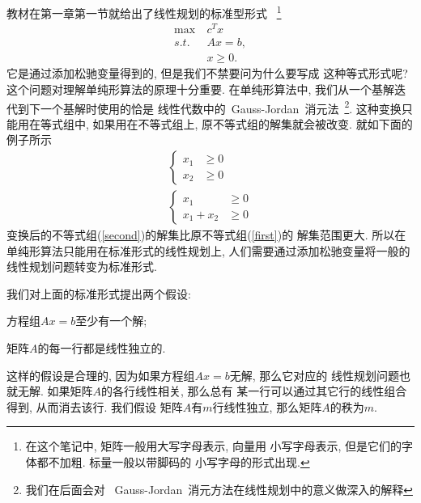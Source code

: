 \documentclass[a4paper,12pt]{article}
\begin{document}
\begin{CJK*}{UTF8}{gbsn}
教材\cite{or}在第一章第一节就给出了线性规划的标准型形式~
\footnote{在这个笔记中, 矩阵一般用大写字母表示, 向量用
小写字母表示, 但是它们的字体都不加粗. 标量一般以带脚码的
小写字母的形式出现. }
\begin{align}
\max~&c^{T} x\\
s.t.~&Ax = b, \\
~&x \geq 0.
\end{align}
它是通过添加松驰变量得到的, 但是我们不禁要问为什么要写成
这种等式形式呢? 这个问题对理解单纯形算法的原理十分重要. 
在单纯形算法中, 我们从一个基解迭代到下一个基解时使用的恰是
线性代数中的~Gauss-Jordan~消元法~\footnote{我们在后面会对
~Gauss-Jordan~消元方法在线性规划中的意义做深入的解释}. 
这种变换只能用在等式组中, 如果用在不等式组上, 
原不等式组的解集就会被改变. 就如下面的例子所示
\begin{eqnarray}
\left\{ \begin{aligned}
x_{1} &\geq 0\\
x_{2} &\geq 0
\end{aligned} \right. \label{first}\\
\left\{ \begin{aligned}
x_{1} &\geq 0\\
x_{1} + x_{2} &\geq 0
\end{aligned} \right. \label{second}
\end{eqnarray}
变换后的不等式组(\ref{second})的解集比原不等式组(\ref{first})的
解集范围更大. 所以在单纯形算法只能用在标准形式的线性规划上, 
人们需要通过添加松驰变量将一般的线性规划问题转变为标准形式. 

我们对上面的标准形式提出两个假设: 
\begin{compactenum}[(1)]
\item 方程组$Ax = b$至少有一个解; 
\item 矩阵$A$的每一行都是线性独立的. 
\end{compactenum}
这样的假设是合理的, 因为如果方程组$Ax = b$无解, 那么它对应的
线性规划问题也就无解. 如果矩阵$A$的各行线性相关, 那么总有
某一行可以通过其它行的线性组合得到, 从而消去该行. 我们假设
矩阵$A$有$m$行线性独立, 那么矩阵$A$的秩为$m$. 


\end{CJK*}
\end{document}
